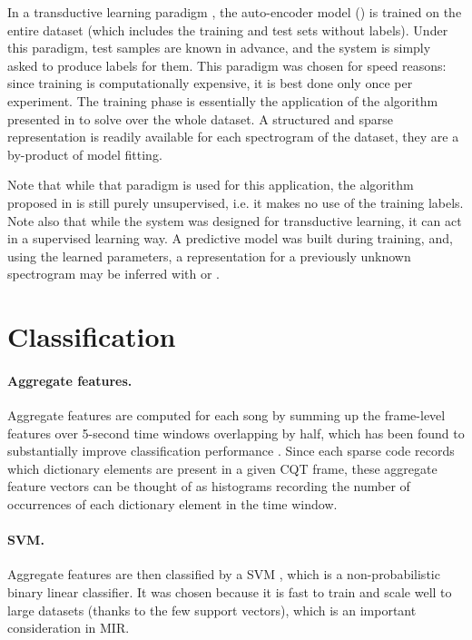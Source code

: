 In a transductive learning paradigm \cite{vapnik1998transductiveLearning}, the auto-encoder model () is trained on the entire dataset (which includes the training and test sets without labels). Under this paradigm, test samples are known in advance, and the system is simply asked to produce labels for them. This paradigm was chosen for speed reasons: since training is computationally expensive, it is best done only once per experiment. The training phase is essentially the application of the algorithm presented in  to solve  over the whole dataset. A structured and sparse representation is readily available for each spectrogram of the dataset, they are a by-product of model fitting.

Note that while that paradigm is used for this application, the algorithm proposed in  is still purely unsupervised, i.e. it makes no use of the training labels.
Note also that while the system was designed for transductive learning, it can act in a supervised learning way. A predictive model was built during training, and, using the learned parameters, a representation for a previously unknown spectrogram may be inferred with  or .

\section{Classification}

\paragraph{Aggregate features.}
Aggregate features are computed for each song by summing up the frame-level features over 5-second time windows overlapping by half, which has been found to substantially improve classification performance \cite{bergstra2006aggregateFeatures, hamel2010aggregateFeatures}. Since each sparse code records which dictionary elements are present in a given \gls{CQT} frame, these aggregate feature vectors can be thought of as histograms recording the number of occurrences of each dictionary element in the time window.

\paragraph{\gls{SVM}.}
Aggregate features are then classified by a \gls{SVM} \cite{cortes1995SVM}, which is a non-probabilistic binary linear classifier. It was chosen because it is fast to train and scale well to large datasets (thanks to the few support vectors), which is an important consideration in \gls{MIR}.

